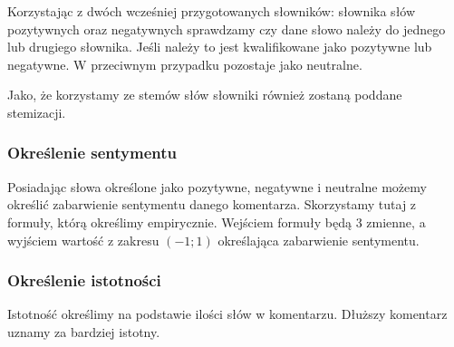 \documentclass[12pt, a4paper]{article}
\begin{document}
Korzystając z dwóch wcześniej przygotowanych słowników: słownika słów pozytywnych oraz negatywnych sprawdzamy czy dane słowo należy do jednego lub drugiego słownika. Jeśli należy to jest kwalifikowane jako pozytywne lub negatywne. W przeciwnym przypadku pozostaje jako neutralne. 

Jako, że korzystamy ze stemów słów słowniki również zostaną poddane stemizacji.

\subsubsection{Określenie sentymentu}

Posiadając słowa określone jako pozytywne, negatywne i neutralne możemy określić zabarwienie sentymentu danego komentarza. Skorzystamy tutaj z formuły, którą określimy empirycznie. Wejściem formuły będą 3 zmienne, a wyjściem wartość z zakresu $(-1;1)$ określająca zabarwienie sentymentu.

\subsubsection{Określenie istotności}

Istotność określimy na podstawie ilości słów w komentarzu. Dłuższy komentarz uznamy za bardziej istotny.


% 
% 
\end{document}
